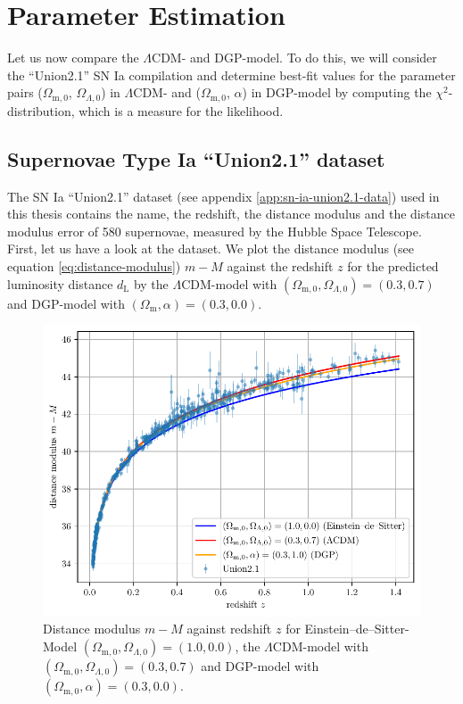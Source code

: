 \chapter{Parameter Estimation}
\label{chap:parameter-estimation}
\thispagestyle{empty}

Let us now compare the $\Lambda$CDM- and DGP-model. To do this, we will consider the ``Union2.1'' SN Ia compilation and determine best-fit values for the parameter pairs ($\Omega_{\text{m},0}$, $\Omega_{\Lambda,0}$) in $\Lambda$CDM- and ($\Omega_{\text{m},0}$, $\alpha$) in DGP-model by computing the $\chi^2$-distribution, which is a measure for the likelihood.

\section{Supernovae Type Ia ``Union2.1'' dataset}

\noindent The SN Ia ``Union2.1'' dataset (see appendix \ref{app:sn-ia-union2.1-data}) used in this thesis contains the name, the redshift, the distance modulus and the distance modulus error of 580 supernovae, measured by the Hubble Space Telescope. \\

\noindent First, let us have a look at the dataset. We plot the distance modulus (see equation \eqref{eq:distance-modulus}) $m - M$ against the redshift $z$ for the predicted luminosity distance $d_{\text{L}}$ by the $\Lambda$CDM-model with $(\Omega_{\text{m},0}, \Omega_{\Lambda,0}) = (0.3, 0.7)$ and DGP-model with $(\Omega_{\text{m}}, \alpha)=(0.3, 0.0)$.

\begin{figure}[H]
   \centering
   \includegraphics[scale=0.97]{figures/plots/PDF/distance-modulus_vs_redshift.pdf}
   \caption{Distance modulus $m - M$ against redshift $z$ for Einstein--de--Sitter-Model $(\Omega_{\text{m},0}, \Omega_{\Lambda,0}) = (1.0, 0.0)$, the $\Lambda$CDM-model with $(\Omega_{\text{m},0}, \Omega_{\Lambda,0}) = (0.3, 0.7)$ and DGP-model with $(\Omega_{\text{m},0}, \alpha) = (0.3, 0.0)$.\\}
   \label{fig:distance-modulus-vs-redshift}
\end{figure}


